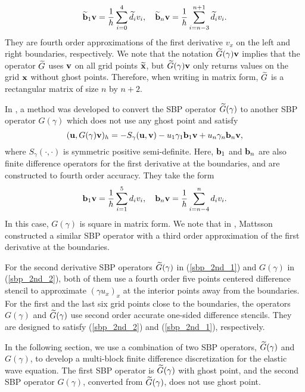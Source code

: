 \begin{equation}\label{sbp_1st_1}
\widetilde{\bf b}_1 {\bf v} = \frac{1}{h}\sum_{i=0}^{4} \widetilde{d}_i v_i, \quad\widetilde{\bf b}_n {\bf v} = \frac{1}{h}\sum_{i=n-3}^{n+1} \widetilde{d}_i v_i.
\end{equation}
They are fourth order approximations of the first derivative $v_x$ on the left and right boundaries, respectively. We note that the notation $\widetilde{G}(\gamma){\bf v}$ implies that the operator $\widetilde{G}$ uses ${\bf v}$ on all grid points $\widetilde{\bf x}$, but $\widetilde{G}(\gamma){\bf v}$ only returns values on the grid ${\bf x}$ without ghost points. Therefore, when writing in matrix form, $\widetilde{G}$ is a rectangular matrix of size $n$ by $n+2$.

 In \cite{wang2018fourth}, a method was developed to convert the SBP operator $\widetilde{G}(\gamma)$ to another SBP operator $G(\gamma)$ which does not use any ghost point and satisfy
 \begin{equation}\label{sbp_2nd_2}
 ({\bf u}, G(\gamma){\bf v})_h = -S_\gamma({\bf u},{\bf v})-u_1\gamma_1{\bf b}_1{\bf v} + u_n\gamma_n{\bf b}_n{\bf v},
 \end{equation}
 where $S_\gamma(\cdot,\cdot)$ is symmetric positive semi-definite. 
 Here, ${\bf b}_1$ and ${\bf b}_n$ are also finite difference operators for the first derivative at the boundaries, and are constructed to fourth order accuracy. They take the form
 \begin{equation}\label{sbp_1st_2}
 {\bf b}_1 {\bf v} = \frac{1}{h}\sum_{i=1}^{5} d_i v_i,\quad {\bf b}_n {\bf v} = \frac{1}{h}\sum_{i=n-4}^{n} d_i v_i.
 \end{equation}
   In this case, ${G}(\gamma)$ is square in matrix form. We note that in  \cite{Mattsson2012}, Mattsson constructed a similar SBP operator with a third order approximation of the first derivative at the boundaries.  %
 
For the second derivative SBP operators $\widetilde{G}(\gamma)$ in (\ref{sbp_2nd_1}) and $G(\gamma)$ in (\ref{sbp_2nd_2}), both of them use a fourth order five points centered difference stencil to approximate $(\gamma u_x)_x$ at the interior points away from the boundaries. For the first and the last six grid points close to the boundaries, the operators $G(\gamma)$ and $\widetilde{G}(\gamma)$ use second order accurate one-sided difference stencils. They are designed to satisfy (\ref{sbp_2nd_2}) and (\ref{sbp_2nd_1}), respectively.

In the following section, we use a combination of two SBP operators, $\widetilde{G}(\gamma)$ and $G(\gamma)$, to develop a multi-block finite difference discretization for the elastic wave equation. The first SBP operator is $\widetilde{G}(\gamma)$ with ghost point, and the second SBP operator $G(\gamma)$, converted from $\widetilde{G}(\gamma)$, does not use ghost point.
